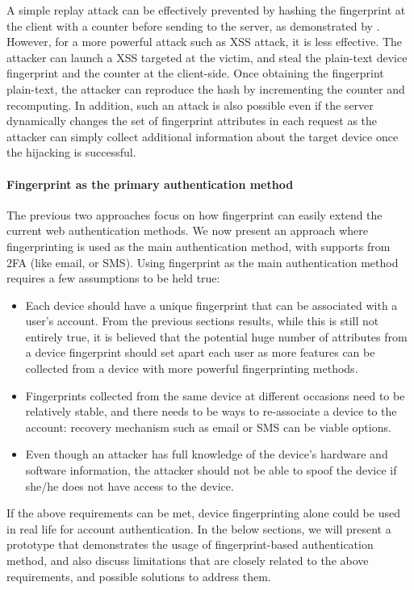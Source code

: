 \documentclass{acm_proc_article-sp}
\begin{document}
A simple replay attack can be effectively prevented by hashing the fingerprint at the client with a counter before sending to the server, as demonstrated by \cite{preu:smart}. However, for a more powerful attack such as XSS attack, it is less effective. The attacker can launch a XSS targeted at the victim, and steal the plain-text device fingerprint and the counter at the client-side. Once obtaining the fingerprint plain-text, the attacker can reproduce the hash by incrementing the counter
and recomputing. In addition, such an attack is also possible even if the server dynamically changes the set of fingerprint attributes in each request \cite{unger:shpf} as the attacker can simply collect additional information about the target device once the hijacking is successful.

\paragraph{ Fingerprint as the primary authentication method}
The previous two approaches focus on how fingerprint can easily extend the current web authentication methods. We now present an approach where fingerprinting is used as the main authentication method, with supports from 2FA (like email, or SMS). 
Using fingerprint as the main authentication method requires a few assumptions to be held true: 
\begin{itemize}
    \item Each device should have a unique fingerprint that can be associated with a user's account. From the previous sections results, while this is still not entirely true, it is believed that the potential huge number of attributes from a device fingerprint should set apart each user as more features can be collected from a device with more powerful fingerprinting methods. 
    \item Fingerprints collected from the same device at different occasions need to be relatively stable, and there needs to be ways to re-associate a device to the account: recovery mechanism such as email or SMS can be viable options. 
    \item Even though an attacker has full knowledge of the device's hardware and software information, the attacker should not be able to spoof the device if she/he does not have access to the device. 
\end{itemize}

If the above requirements can be met, device fingerprinting alone could be used in real life for account authentication. In the below sections, we will present a prototype that demonstrates the usage of fingerprint-based authentication method, and also discuss limitations that are closely related to the above requirements, and possible solutions to address them.
\end{document}
